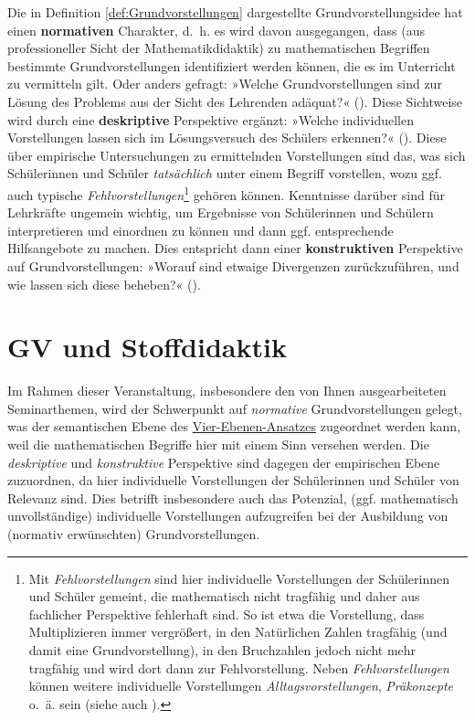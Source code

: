 \documentclass[
]{scrbook}
\theoremstyle{definition}
\theoremstyle{definition}
\theoremstyle{definition}
\theoremstyle{definition}
\theoremstyle{remark}
\begin{document}
Die in Definition \ref{def:Grundvorstellungen} dargestellte Grundvorstellungsidee hat einen \textbf{normativen} Charakter, d.~h. es wird davon ausgegangen, dass (aus professioneller Sicht der Mathematikdidaktik) zu mathematischen Begriffen bestimmte Grundvorstellungen identifiziert werden können, die es im Unterricht zu vermitteln gilt. Oder anders gefragt: »Welche Grundvorstellungen sind zur Lösung des Problems aus der Sicht des Lehrenden adäquat?« (). Diese Sichtweise wird durch eine \textbf{deskriptive} Perspektive ergänzt: »Welche individuellen Vorstellungen lassen sich im Lösungsversuch des Schülers erkennen?« (). Diese über empirische Untersuchungen zu ermittelnden Vorstellungen sind das, was sich Schülerinnen und Schüler \emph{tatsächlich} unter einem Begriff vorstellen, wozu ggf. auch typische \emph{Fehlvorstellungen}\footnote{Mit \emph{Fehlvorstellungen} sind hier individuelle Vorstellungen der Schülerinnen und Schüler gemeint, die mathematisch nicht tragfähig und daher aus fachlicher Perspektive fehlerhaft sind. So ist etwa die Vorstellung, dass Multiplizieren immer vergrößert, in den Natürlichen Zahlen tragfähig (und damit eine Grundvorstellung), in den Bruchzahlen jedoch nicht mehr tragfähig und wird dort dann zur Fehlvorstellung. Neben \emph{Fehlvorstellungen} können weitere individuelle Vorstellungen \emph{Alltagsvorstellungen}, \emph{Präkonzepte} o.~ä. sein (siehe auch ).} gehören können. Kenntnisse darüber sind für Lehrkräfte ungemein wichtig, um Ergebnisse von Schülerinnen und Schülern interpretieren und einordnen zu können und dann ggf. entsprechende Hilfsangebote zu machen. Dies entspricht dann einer \textbf{konstruktiven} Perspektive auf Grundvorstellungen: »Worauf sind etwaige Divergenzen zurückzuführen, und wie lassen sich diese beheben?« ().

\section{GV und Stoffdidaktik}\label{gv-und-stoffdidaktik}

Im Rahmen dieser Veranstaltung, insbesondere den von Ihnen ausgearbeiteten Seminarthemen, wird der Schwerpunkt auf \emph{normative} Grundvorstellungen gelegt, was der \textcolor{semanticColor}{semantischen Ebene} des \hyperref[tab:fragen-ebenen]{Vier-Ebenen-Ansatzes} zugeordnet werden kann, weil die mathematischen Begriffe hier mit einem Sinn versehen werden. Die \emph{deskriptive} und \emph{konstruktive} Perspektive sind dagegen der \textcolor{empiricColor}{empirischen Ebene} zuzuordnen, da hier individuelle Vorstellungen der Schülerinnen und Schüler von Relevanz sind. Dies betrifft insbesondere auch das Potenzial, (ggf. mathematisch unvollständige) individuelle Vorstellungen aufzugreifen bei der Ausbildung von (normativ erwünschten) Grundvorstellungen.
\end{document}
